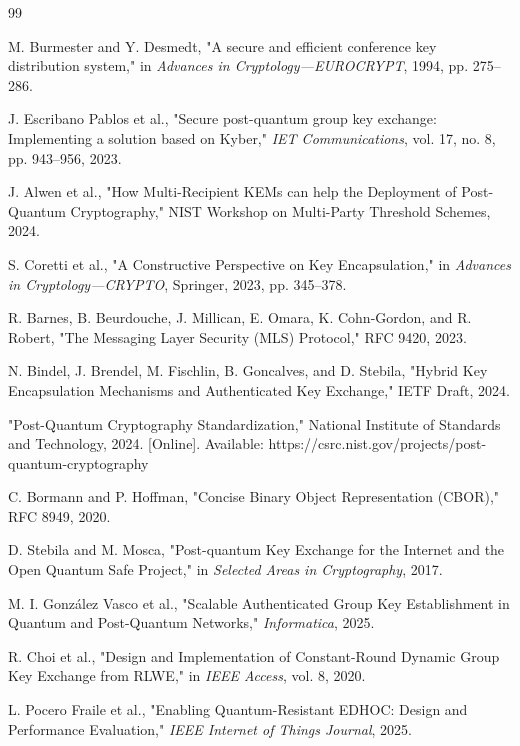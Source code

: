 \documentclass[12pt,a4paper]{report}
\begin{document}

\begin{thebibliography}{99}

M. Burmester and Y. Desmedt, "A secure and efficient conference key distribution system," in \textit{Advances in Cryptology—EUROCRYPT}, 1994, pp. 275–286.

J. Escribano Pablos et al., "Secure post-quantum group key exchange: Implementing a solution based on Kyber," \textit{IET Communications}, vol. 17, no. 8, pp. 943–956, 2023.

J. Alwen et al., "How Multi-Recipient KEMs can help the Deployment of Post-Quantum Cryptography," NIST Workshop on Multi-Party Threshold Schemes, 2024.

S. Coretti et al., "A Constructive Perspective on Key Encapsulation," in \textit{Advances in Cryptology—CRYPTO}, Springer, 2023, pp. 345–378.

R. Barnes, B. Beurdouche, J. Millican, E. Omara, K. Cohn-Gordon, and R. Robert, "The Messaging Layer Security (MLS) Protocol," RFC 9420, 2023.

N. Bindel, J. Brendel, M. Fischlin, B. Goncalves, and D. Stebila, "Hybrid Key Encapsulation Mechanisms and Authenticated Key Exchange," IETF Draft, 2024.

"Post-Quantum Cryptography Standardization," National Institute of Standards and Technology, 2024. [Online]. Available: https://csrc.nist.gov/projects/post-quantum-cryptography

C. Bormann and P. Hoffman, "Concise Binary Object Representation (CBOR)," RFC 8949, 2020.

D. Stebila and M. Mosca, "Post-quantum Key Exchange for the Internet and the Open Quantum Safe Project," in \textit{Selected Areas in Cryptography}, 2017.

M. I. González Vasco et al., "Scalable Authenticated Group Key Establishment in Quantum and Post-Quantum Networks," \textit{Informatica}, 2025.

R. Choi et al., "Design and Implementation of Constant-Round Dynamic Group Key Exchange from RLWE," in \textit{IEEE Access}, vol. 8, 2020.

L. Pocero Fraile et al., "Enabling Quantum-Resistant EDHOC: Design and Performance Evaluation," \textit{IEEE Internet of Things Journal}, 2025.


\end{thebibliography}
\end{document}

